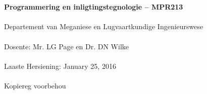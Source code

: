 \begin{titlepage}
    \thispagestyle{empty}
    \\~\\[18cm]
    \large
    \textbf{Programmering en inligtingstegnologie -- MPR213} \\~\\
    Departement van Meganiese en Lugvaartkundige Ingenieurswese \\~\\[0.5cm]
    \normalsize
    Dosente: Mr. LG Page en  Dr. DN Wilke \\~\\
    Laaste Hersiening: January 25, 2016 \\~\\[0.5em]
    \textcopyright \quad Kopiereg voorbehou \\~\\
\end{titlepage}
\restoregeometry
